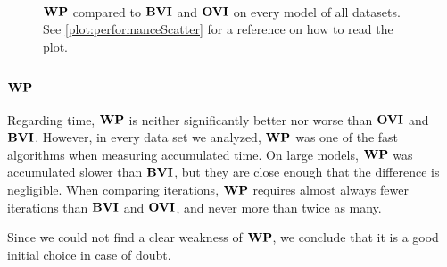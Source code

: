 \begin{figure}[h!]
    \centering
    \
    \caption{$\mathbf{WP}$ compared to $\mathbf{BVI}$ and $\mathbf{OVI}$ on every model of all datasets. See \ref{plot:performanceScatter} for a reference on how to read the plot.}%
    \label{fig:WPvsBVIvsOVI}%
    \end{figure}
\FloatBarrier

\subsubsection*{$\mathbf{WP}$}
Regarding time, $\mathbf{WP}$ is neither significantly better nor worse than $\mathbf{OVI}$ and $\mathbf{BVI}$.
However, in every data set we analyzed, $\mathbf{WP}$ was one of the fast algorithms when measuring accumulated time.
On large models, $\mathbf{WP}$ was accumulated slower than $\mathbf{BVI}$, but they are close enough that the difference is negligible.
When comparing iterations, $\mathbf{WP}$ requires almost always fewer iterations than $\mathbf{BVI}$ and $\mathbf{OVI}$, and never more than twice as many.

Since we could not find a clear weakness of $\mathbf{WP}$, we conclude that it is a good initial choice in case of doubt.

